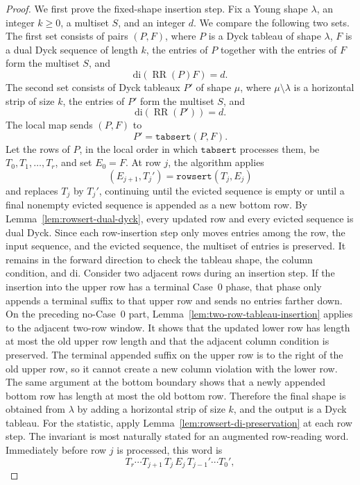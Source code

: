 \documentclass[11pt]{article}
\theoremstyle{plain}
\theoremstyle{definition}
\theoremstyle{remark}
\newcommand{\di}{\mathrm{di}}
\newcommand{\rowsert}{\texttt{rowsert}}
\begin{document}
\begin{proof}
We first prove the fixed-shape insertion step.  Fix a Young shape \(\lambda\),
an integer \(k\ge 0\), a multiset \(S\), and an integer \(d\).  We compare the
following two sets.
The first set consists of pairs \((P,F)\), where \(P\) is a Dyck tableau of
shape \(\lambda\), \(F\) is a dual Dyck sequence of length \(k\), the entries
of \(P\) together with the entries of \(F\) form the multiset \(S\), and
\[
  \di(\operatorname{RR}(P)F)=d.
\]
The second set consists of Dyck tableaux \(P'\) of shape \(\mu\), where
\(\mu\setminus\lambda\) is a horizontal strip of size \(k\), the entries of
\(P'\) form the multiset \(S\), and
\[
  \di(\operatorname{RR}(P'))=d.
\]
The local map sends \((P,F)\) to
\[
  P'=\texttt{tabsert}(P,F).
\]
Let the rows of \(P\), in the local order in which \(\texttt{tabsert}\)
processes them, be \(T_0,T_1,\ldots,T_r\), and set \(E_0=F\).  At row \(j\),
the algorithm applies
\[
  (E_{j+1},T_j')=\rowsert(T_j,E_j)
\]
and replaces \(T_j\) by \(T_j'\), continuing until the evicted sequence is empty
or until a final nonempty evicted sequence is appended as a new bottom row.  By
Lemma~\ref{lem:rowsert-dual-dyck}, every updated row and every evicted sequence
is dual Dyck.  Since each row-insertion step only moves entries among the row,
the input sequence, and the evicted sequence, the multiset of entries is
preserved.
It remains in the forward direction to check the tableau shape, the column
condition, and \(\di\).  Consider two adjacent rows during an insertion step.
If the insertion into the upper row has a terminal Case~0 phase, that phase
only appends a terminal suffix to that upper row and sends no entries farther
down.  On the preceding no-Case~0 part, Lemma~\ref{lem:two-row-tableau-insertion}
applies to the adjacent two-row window.  It shows that the updated lower row has
length at most the old upper row length and that the adjacent column condition
is preserved.  The terminal appended suffix on the upper row is to the right of
the old upper row, so it cannot create a new column violation with the lower
row.  The same argument at the bottom boundary shows that a newly appended
bottom row has length at most the old bottom row.  Therefore the final shape is
obtained from \(\lambda\) by adding a horizontal strip of size \(k\), and the
output is a Dyck tableau.
For the statistic, apply Lemma~\ref{lem:rowsert-di-preservation} at each row
step.  The invariant is most naturally stated for an augmented row-reading word.
Immediately before row \(j\) is processed, this word is
\[
  T_r\cdots T_{j+1}\,T_j\,E_j\,T_{j-1}'\cdots T_0',
\]
\end{proof}
\end{document}
